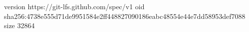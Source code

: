 version https://git-lfs.github.com/spec/v1
oid sha256:4738e555d71de9951584e2ff448827090186eabc48554e44e7dd58953def7088
size 32864
